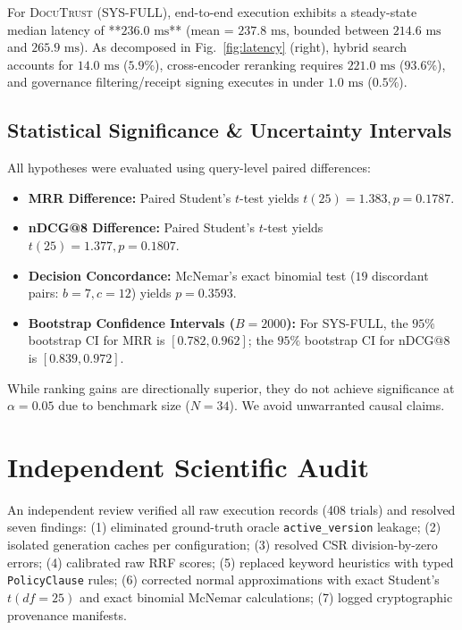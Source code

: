 \documentclass[journal,twoside]{IEEEtran}
\newcommand{\sysname}{\textsc{DocuTrust}}
\begin{document}
For \sysname{} (SYS-FULL), end-to-end execution exhibits a steady-state median latency of **$236.0\text{ ms}$** (mean = $237.8\text{ ms}$, bounded between $214.6\text{ ms}$ and $265.9\text{ ms}$).
As decomposed in Fig.~\ref{fig:latency} (right), hybrid search accounts for $14.0\text{ ms}$ ($5.9\%$), cross-encoder reranking requires $221.0\text{ ms}$ ($93.6\%$), and governance filtering/receipt signing executes in under $1.0\text{ ms}$ ($0.5\%$).

\subsection{Statistical Significance \& Uncertainty Intervals}
All hypotheses were evaluated using query-level paired differences:
\begin{itemize}
  \item \textbf{MRR Difference:} Paired Student's $t$-test yields $t(25) = 1.383, p = 0.1787$.
  \item \textbf{nDCG@8 Difference:} Paired Student's $t$-test yields $t(25) = 1.377, p = 0.1807$.
  \item \textbf{Decision Concordance:} McNemar's exact binomial test ($19$ discordant pairs: $b=7, c=12$) yields $p = 0.3593$.
  \item \textbf{Bootstrap Confidence Intervals ($B=2000$):} For SYS-FULL, the $95\%$ bootstrap CI for MRR is $[0.782, 0.962]$; the $95\%$ bootstrap CI for nDCG@8 is $[0.839, 0.972]$.
\end{itemize}
While ranking gains are directionally superior, they do not achieve significance at $\alpha = 0.05$ due to benchmark size ($N=34$). We avoid unwarranted causal claims.

\section{Independent Scientific Audit}
\label{sec:audit}

An independent review verified all raw execution records (408 trials) and resolved seven findings:
(1) eliminated ground-truth oracle \texttt{active\_version} leakage;
(2) isolated generation caches per configuration;
(3) resolved CSR division-by-zero errors;
(4) calibrated raw RRF scores;
(5) replaced keyword heuristics with typed \texttt{PolicyClause} rules;
(6) corrected normal approximations with exact Student's $t(df=25)$ and exact binomial McNemar calculations;
(7) logged cryptographic provenance manifests.
\end{document}
